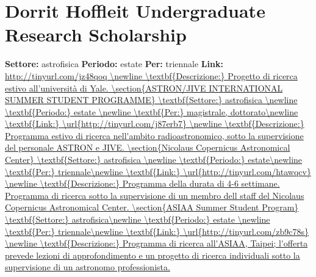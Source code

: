 \documentclass[a4paper,10pt]{article}
\begin{document}
\section{Dorrit Hoffleit Undergraduate Research Scholarship}
\textbf{Settore:} astrofisica\newline
\textbf{Periodo:} estate\newline
\textbf{Per:} triennale\newline
\textbf{Link:} \url{http://tinyurl.com/jz48qoq \newline
\textbf{Descrizione:} Progetto di ricerca estivo all’università di Yale.	

\section{ASTRON/JIVE INTERNATIONAL SUMMER STUDENT PROGRAMME}	
\textbf{Settore:} astrofisica \newline
\textbf{Periodo:} estate \newline
\textbf{Per:} magistrale, dottorato\newline
\textbf{Link:} \url{http://tinyurl.com/j87erb7} \newline
\textbf{Descrizione:} Programma estivo di ricerca nell'ambito radioastronomico, sotto la supervisione del personale ASTRON e JIVE.	

\section{Nicolaus Copernicus Astronomical Center}	
\textbf{Settore:} astrofisica \newline
\textbf{Periodo:} estate\newline
\textbf{Per:} triennale\newline
\textbf{Link:} \url{http://tinyurl.com/htawqcv} \newline
\textbf{Descrizione:} Programma della durata di 4-6 settimane. Programma di ricerca sotto la supervisione di un membro dell staff del Nicolaus Copernicus Astronomical Center.	

\section{ASIAA Summer Student Program}
\textbf{Settore:} astrofisica\newline
\textbf{Periodo:} estate \newline
\textbf{Per:} triennale\newline
\textbf{Link:} \url{http://tinyurl.com/zb9c78s} \newline
\textbf{Descrizione:} Programma di ricerca all'ASIAA, Taipei; l'offerta prevede lezioni di approfondimento e un progetto di ricerca individuali sotto la supervisione di un astronomo professionista.	

}
\end{document}
